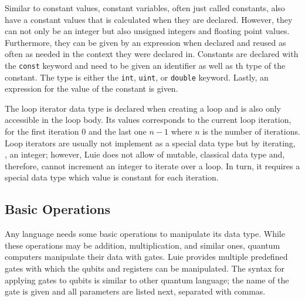 Similar to constant values, constant variables, often just called constants, also have a constant values that is calculated when they are declared. However, they can not only be an integer but also unsigned integers and floating point values. Furthermore, they can be given by an expression when declared and reused as often as needed in the context they were declared in. Constants are declared with the \texttt{const} keyword and need to be given an identifier as well as th type of the constant. The type is either the \texttt{int}, \texttt{uint}, or \texttt{double} keyword. Lastly, an expression for the value of the constant is given.  

The loop iterator data type is declared when creating a loop and is also only accessible in the loop body. Its values corresponds to the current loop iteration, \eg for the first iteration $0$ and the last one $n - 1$ where $n$ is the number of iterations. Loop iterators are usually not implement as a special data type but by iterating, \eg, an integer; however, Luie does not allow of mutable, classical data type and, therefore, cannot increment an integer to iterate over a loop. In turn, it requires a special data type which value is constant for each iteration. 

\subsection{Basic Operations}
\label{sec:concept_basicOperations}
Any language needs some basic operations to manipulate its data type. While these operations may be addition, multiplication, and similar ones, quantum computers manipulate their data with gates. Luie provides multiple predefined gates with which the qubits and registers can be manipulated. The syntax for applying gates to qubits is similar to other quantum language; the name of the gate is given and all parameters are listed next, separated with commas. 

